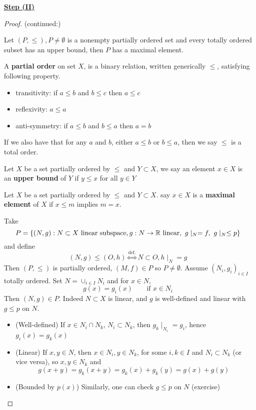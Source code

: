\documentclass{article}
\begin{document}
\underline{\textbf{Step (II)}}\nl
\begin{proof}(continued:)
\begin{lemma}\nl
\label{Zorn's Lemma}
	Let $(P, \leq), P\neq \emptyset$ is a nonempty partially ordered set and every totally ordered subset has an upper bound, then $P$ has a maximal element.
\end{lemma}  
\begin{unexaminable}
    \begin{definition}
\nl
	A \textbf{partial order} on set $X$, is a binary relation, written generically $\leq$, satisfying following property.
	\begin{itemize}
		\item transitivity: if $a\leq b$ and $b\leq c$ then $a\leq c$
		\item reflexivity: $a\leq a$
		\item anti-symmetry: if $a\leq b$ and $b\leq a$ then $a=b$

	\end{itemize}
	If we also have that for any $a$ and $b$, either $a\leq b$ or $b\leq a$, then we say $\leq$ is a total order.
\end{definition}

\begin{definition}
\nl
	Let $X$ be a set partially ordered by $\leq$ and $Y\subset X$, we say an element $x\in X$ is an {\bf upper bound} of $Y$ if $y\leq x$ for all $y \in Y$

\end{definition}

\begin{definition}
\nl
	Let $X$ be a set partially ordered by $\leq$ and $Y\subset X$. say $x\in X$ is a \textbf{maximal element} of $X$ if $x\leq m$ implies $m=x$.

\end{definition}
\end{unexaminable}
Take 
$$
P = \{(N,g): N\subset X \ \text{linear\ subspace}, g: N \to \real \ \text{linear}, \ g\mid_N=f, \ g\mid_N \leq p\}
$$  
and define  
$$
(N,g) \leq (O, h ) \overset{\text{def.}}{\iff} N \subset O, h\mid_N = g
$$
Then $(P, \leq)$ is partially ordered, $(M,f) \in P$ so $P \neq \emptyset$. Assume $(N_i, g_i)_{i \in I}$ totally ordered. Set $N = \cup_{i\in I} N_i$ and for $x\in N$,  
$$
g(x) = g_i(x) \qquad \text{if\ }x\in N_i
$$
Then $(N,g) \in P$. Indeed $N\subset X$ is linear, and $g$ is well-defined and linear with $g\leq p$ on $N$.
\begin{itemize}
    \item (Well-defined) If $x \in N_i \cap N_k$, $N_i \subset N_k$, then $g_k \mid_{N_i}=g_i$, hence $g_i(x)=g_k(x)$
    \item (Linear) If $x,y \in N$, then $x\in N_i, y\in N_k$, for some $i,k \in I$ and $N_i \subset N_k$ (or vice versa), so $x, y \in N_k$ and  
    $$
    g(x+y) = g_k(x+y) = g_k(x)+g_k(y) = g(x) + g(y)
    $$
    \item (Bounded by $p(x)$) Similarly, one can check $g \leq p$ on $N$ (exercise)
\end{itemize}  


\end{proof}
\end{document}
